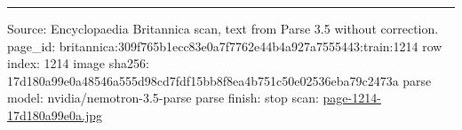 \documentclass[10pt]{article}
\begin{document}
\vfill\par\noindent\rule{\linewidth}{0.4pt}\par
{\scriptsize\color{gray}\noindent Source: Encyclopaedia Britannica scan, text from Parse 3.5 without correction. page\_id: britannica:309f765b1ecc83e0a7f7762e44b4a927a7555443:train:1214 \quad row index: 1214 \quad image sha256: 17d180a99e0a48546a555d98cd7fdf15bb8f8ea4b751c50e02536eba79c2473a \quad parse model: nvidia/nemotron-3.5-parse \quad parse finish: stop \quad scan: \href{../scans/page-1214-17d180a99e0a.jpg}{page-1214-17d180a99e0a.jpg}\par}
\end{document}
